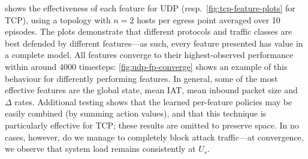 \documentclass[conference, a4paper, 10pt, times]{IEEEtran}
\begin{document}
 shows the effectiveness of each feature for UDP (resp.\ \cref{fig:tcp-feature-plots} for TCP), using a topology with $n=2$ hosts per egress point averaged over 10 episodes.
The plots demonstrate that different protocols and traffic classes are best defended by different features---as such, every feature presented has value in a complete model.
All features converge to their highest-observed performance within around \num{4000} timesteps: \cref{fig:udp-fp-converge} shows an example of this behaviour for differently performing features.
In general, some of the most effective features are the global state, mean IAT, mean inbound packet size and $\Delta$ rates.
Additional testing shows that the learned per-feature policies may be easily combined (by summing action values), and that this technique is particularly effective for TCP; these results are omitted to preserve space.
In no cases, however, do we manage to completely block attack traffic---at convergence, we observe that system load remains consistently at $U_s$.
\end{document}
